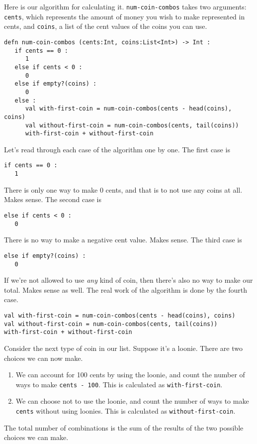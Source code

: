 \documentclass[10pt,oneside]{book}
\begin{document}
Here is our algorithm for calculating it. \texttt{\frenchspacing num-coin-combos} takes two arguments: \texttt{\frenchspacing cents}, which represents the amount of money you wish to make represented in cents, and \texttt{\frenchspacing coins}, a list of the cent values of the coins you can use. 
\begin{lstlisting}
defn num-coin-combos (cents:Int, coins:List<Int>) -> Int :
   if cents == 0 :
      1
   else if cents < 0 :
      0
   else if empty?(coins) :
      0
   else :
      val with-first-coin = num-coin-combos(cents - head(coins), coins)
      val without-first-coin = num-coin-combos(cents, tail(coins))
      with-first-coin + without-first-coin
\end{lstlisting}
Let's read through each case of the algorithm one by one. The first case is
\begin{lstlisting}
if cents == 0 :
   1
\end{lstlisting}
There is only one way to make 0 cents, and that is to not use any coins at all. Makes sense.
The second case is
\begin{lstlisting}
else if cents < 0 :
   0
\end{lstlisting}
There is no way to make a negative cent value. Makes sense.
The third case is
\begin{lstlisting}
else if empty?(coins) :
   0
\end{lstlisting}
If we're not allowed to use {\em any} kind of coin, then there's also no way to make our total. Makes sense as well.
The real work of the algorithm is done by the fourth case.
\begin{lstlisting}
val with-first-coin = num-coin-combos(cents - head(coins), coins)
val without-first-coin = num-coin-combos(cents, tail(coins))
with-first-coin + without-first-coin
\end{lstlisting}
Consider the next type of coin in our list. Suppose it's a loonie. There are two choices we can now make. 
\begin{enumerate}
\item We can account for 100 cents by using the loonie, and count the number of ways to make \texttt{\frenchspacing cents - 100}. This is calculated as \texttt{\frenchspacing with-first-coin}.
\item We can choose not to use the loonie, and count the number of ways to make \texttt{\frenchspacing cents} without using loonies. This is calculated as \texttt{\frenchspacing without-first-coin}.
\end{enumerate}
The total number of combinations is the sum of the results of the two possible choices we can make.
\end{document}
